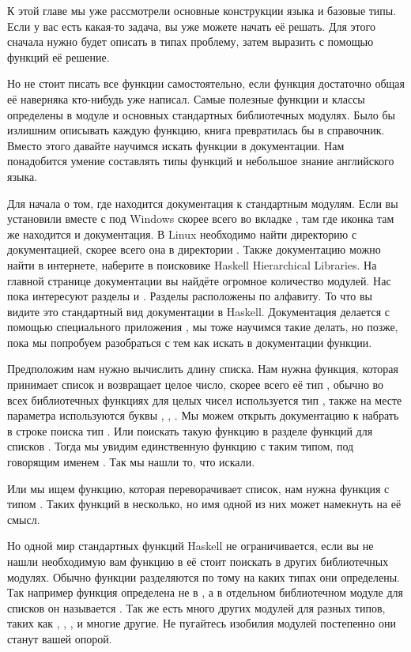 К этой главе мы уже рассмотрели основные конструкции языка
и базовые типы. Если у вас есть какая-то задача, вы уже можете
начать её решать. Для этого сначала нужно будет описать
в типах проблему, затем выразить с помощью функций её решение.

Но не стоит писать все функции самостоятельно, если функция
достаточно общая её наверняка кто-нибудь уже написал. 
Самые полезные функции и классы определены в модуле 
и основных стандартных библиотечных модулях. Было бы
излишним описывать каждую функцию, книга превратилась бы в
справочник. Вместо этого давайте научимся искать функции
в документации. Нам понадобится умение составлять типы
функций и небольшое знание английского языка. 

Для начала о том, где находится документация к стандартным модулям. 
Если вы установили  вместе с  под
Windows скорее всего во вкладке , там где иконка 
там же находится и документация. В Linux необходимо найти 
директорию с документацией, скорее всего она в директории
. Также документацию
можно найти в интернете, наберите в поисковике 
Haskell Hierarchical Libraries. На главной странице документации
вы найдёте огромное количество модулей. Нас пока интересуют
разделы  и . Разделы расположены по алфавиту.
То что вы видите это стандартный вид документации в Haskell. 
Документация делается с помощью специального приложения
, мы тоже научимся такие делать, но позже,
пока мы попробуем разобраться с тем как искать в документации
функции.  

Предположим нам нужно вычислить длину списка. Нам нужна
функция, которая принимает список и возвращает целое число,
скорее всего её тип , обычно во всех библиотечных
функциях для целых чисел используется тип , также на 
месте параметра используются буквы , , . 
Мы можем открыть документацию к  набрать в
строке поиска тип . Или поискать такую функцию
в разделе функций для списков . Тогда
мы увидим единственную функцию с таким типом, под говорящим 
именем . Так мы нашли то, что искали.

Или мы ищем функцию, которая переворачивает список, нам 
нужна функция с типом \In{[a] -> [a]}. Таких функций в 
несколько, но имя  одной из них может намекнуть
на её смысл. 

Но одной  мир стандартных функций Haskell 
не ограничивается, если вы не нашли необходимую вам функцию
в  её стоит поискать в других библиотечных модулях.
Обычно функции разделяются по тому на каких типах они определены.
Так например функция  определена
не в , а в отдельном библиотечном модуле для списков
он называется . Так же есть много других модулей
для разных типов, таких как , ,
,  и многие другие. Не пугайтесь
изобилия модулей постепенно они станут вашей опорой.

